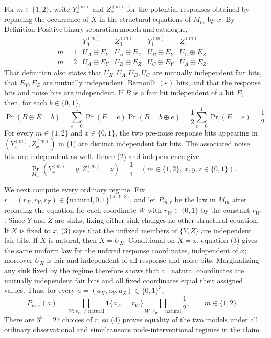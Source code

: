 For \(m\in\{1,2\}\), write \(Y_x^{(m)}\) and \(Z_x^{(m)}\) for the potential responses obtained by replacing the occurrence of \(X\) in the structural equations of \(M_m\) by \(x\).  By Definition \(\mathrm{Positive\ binary\ separation\ models\ and\ catalogue}\),
\[
\begin{array}{c|cc|cc}
 &Y_0^{(m)}&Z_0^{(m)}&Y_1^{(m)}&Z_1^{(m)}\\ \hline
m=1&U_A\mathbin\oplus E_Y&U_B\mathbin\oplus E_Z&U_B\mathbin\oplus E_Y&U_C\mathbin\oplus E_Z\\
m=2&U_A\mathbin\oplus E_Y&U_B\mathbin\oplus E_Z&U_C\mathbin\oplus E_Y&U_A\mathbin\oplus E_Z.
\end{array}
\tag{1}
\]
That definition also states that \(U_X,U_A,U_B,U_C\) are mutually independent fair bits, that \(E_Y,E_Z\) are mutually independent \(\operatorname{Bernoulli}(\varepsilon)\) bits, and that the response bits and noise bits are independent.  If \(B\) is a fair bit independent of a bit \(E\), then, for each \(b\in\{0,1\}\),
\[
 \Pr(B\mathbin\oplus E=b)
 =\sum_{e=0}^{1}\Pr(E=e)\Pr(B=b\mathbin\oplus e)
 =\frac12\sum_{e=0}^{1}\Pr(E=e)=\frac12.
\tag{2}
\]
For every \(m\in\{1,2\}\) and \(x\in\{0,1\}\), the two pre-noise response bits appearing in \((Y_x^{(m)},Z_x^{(m)})\) in (1) are distinct independent fair bits.  The associated noise bits are independent as well.  Hence (2) and independence give
\[
 \Pr_{M_m}\!\left(Y_x^{(m)}=y,Z_x^{(m)}=z\right)=\frac14
 \quad
 (m\in\{1,2\},\ x,y,z\in\{0,1\}).
\tag{3}
\]

We next compute every ordinary regime.  Fix
\(r=(r_X,r_Y,r_Z)\in\{\mathrm{natural},0,1\}^{\{X,Y,Z\}}\), and let \(P_{m,r}\) be the law in \(M_m\) after replacing the equation for each coordinate \(W\) with \(r_W\in\{0,1\}\) by the constant \(r_W\).  Since \(Y\) and \(Z\) are sinks, fixing either sink changes no other structural equation.  If \(X\) is fixed to \(x\), (3) says that the unfixed members of \(\{Y,Z\}\) are independent fair bits.  If \(X\) is natural, then \(X=U_X\).  Conditional on \(X=x\), equation (3) gives the same uniform law for the unfixed response coordinates, independent of \(x\); moreover \(U_X\) is fair and independent of all response and noise bits.  Marginalizing any sink fixed by the regime therefore shows that all natural coordinates are mutually independent fair bits and all fixed coordinates equal their assigned values.  Thus, for every \(a=(a_X,a_Y,a_Z)\in\{0,1\}^3\),
\[
 P_{m,r}(a)
 =\prod_{W:\,r_W\ne\mathrm{natural}}\mathbf 1\{a_W=r_W\}
  \prod_{W:\,r_W=\mathrm{natural}}\frac12,
 \qquad m\in\{1,2\}.
\tag{4}
\]
There are \(3^3=27\) choices of \(r\), so (4) proves equality of the two models under all ordinary observational and simultaneous node-interventional regimes in the claim.

